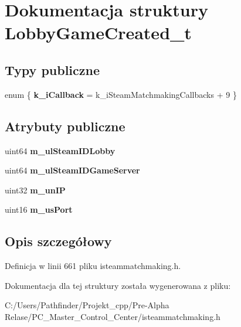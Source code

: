 \hypertarget{struct_lobby_game_created__t}{}\section{Dokumentacja struktury Lobby\+Game\+Created\+\_\+t}
\label{struct_lobby_game_created__t}
\subsection*{Typy publiczne}
\begin{DoxyCompactItemize}
\item 
\mbox{\label{struct_lobby_game_created__t_a992e157121042f48bc02774a670e878c}} 
enum \{ {\bfseries k\+\_\+i\+Callback} = k\+\_\+i\+Steam\+Matchmaking\+Callbacks + 9
 \}
\end{DoxyCompactItemize}
\subsection*{Atrybuty publiczne}
\begin{DoxyCompactItemize}
\item 
\mbox{\label{struct_lobby_game_created__t_afc3bd15a8c7de7b01a8de836f6c29f91}} 
uint64 {\bfseries m\+\_\+ul\+Steam\+I\+D\+Lobby}
\item 
\mbox{\label{struct_lobby_game_created__t_afdc6cbfd4d8c64289292f09a35df156b}} 
uint64 {\bfseries m\+\_\+ul\+Steam\+I\+D\+Game\+Server}
\item 
\mbox{\label{struct_lobby_game_created__t_a3cf6bea0d4c8cb3322739cb0e9989cae}} 
uint32 {\bfseries m\+\_\+un\+IP}
\item 
\mbox{\label{struct_lobby_game_created__t_a7f691ae0db62bb243f1bf4df0f48e02c}} 
uint16 {\bfseries m\+\_\+us\+Port}
\end{DoxyCompactItemize}


\subsection{Opis szczegółowy}


Definicja w linii 661 pliku isteammatchmaking.\+h.



Dokumentacja dla tej struktury została wygenerowana z pliku\+:\begin{DoxyCompactItemize}
\item 
C\+:/\+Users/\+Pathfinder/\+Projekt\+\_\+cpp/\+Pre-\/\+Alpha Relase/\+P\+C\+\_\+\+Master\+\_\+\+Control\+\_\+\+Center/isteammatchmaking.\+h\end{DoxyCompactItemize}
